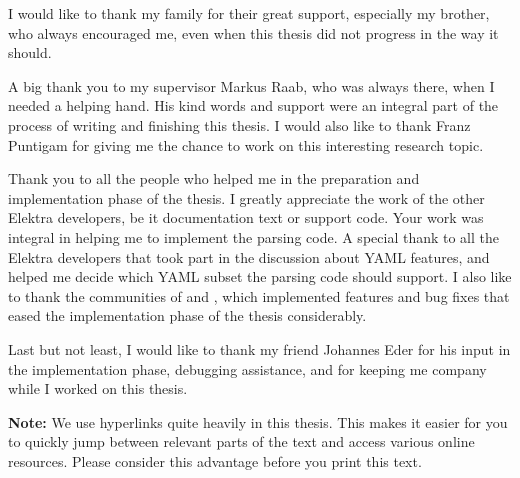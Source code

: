 \begin{acknowledgements*}
I would like to thank my family for their great support, especially my brother, who always encouraged me, even when this thesis did not progress in the way it should.

A big thank you to my supervisor Markus Raab, who was always there, when I needed a helping hand. His kind words and support were an integral part of the process of writing and finishing this thesis. I would also like to thank Franz Puntigam for giving me the chance to work on this interesting research topic.

Thank you to all the people who helped me in the preparation and implementation phase of the thesis. I greatly appreciate the work of the other Elektra developers, be it documentation text or support code. Your work was integral in helping me to implement the parsing code. A special thank to all the Elektra developers that took part in the discussion about YAML features, and helped me decide which YAML subset the parsing code should support. I also like to thank the communities of  and , which implemented features and bug fixes that eased the implementation phase of the thesis considerably.

Last but not least, I would like to thank my friend Johannes Eder for his input in the implementation phase, debugging assistance, and for keeping me company while I worked on this thesis.
\end{acknowledgements*}

\vfill
\begin{leftbar}
\textbf{Note:} We use hyperlinks quite heavily in this thesis. This makes it easier for you to quickly jump between relevant parts of the text and access various online resources. Please consider this advantage before you print this text.
\end{leftbar}
